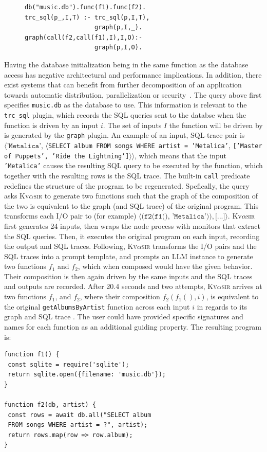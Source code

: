 \documentclass[nonacm,sigplan,review]{acmart}
\newcommand{\sys}{{\scshape Kv{$\alpha$}sir}\xspace}
\newcommand{\ttt}[1]{\texttt{#1}\xspace}
\begin{document}
\begin{figure}
  \begin{verbatim}
db("music.db").func(f1).func(f2).
trc_sql(p_,I,T) :- trc_sql(p,I,T),
                   graph(p,I,_).
graph(call(f2,call(f1),I),I,O):-
                   graph(p,I,O).
\end{verbatim}
\end{figure}
Having the database initialization being in the same function as 
the database access has negative architectural and performance implications.
In addition, there exist systems that can benefit from further decomposition
of an application towards automatic distribution, parallelization or security~\cite{Towards_Modern_Ghemaw_2023, vasilakis2019ignis, vasilakis2018breakapp}.
The query above first specifies \ttt{music.db} as the database to use.
This information is relevant to the \ttt{trc\_sql} plugin, which records the SQL queries 
sent to the databse when the function is driven by an input $i$.
The set of inputs $I$ the function will be driven by is generated by the \ttt{graph} plugin.
An example of an input, SQL-trace pair is
$\langle\ttt{'Metalica'}$, $\langle$\ttt{SELECT album FROM songs WHERE artist = 'Metalica'}, \ttt{['Master of Puppets', 'Ride the Lightning']}$\rangle\rangle$,
which means that the input \ttt{'Metalica'} causes the resulting SQL query to be executed by the function,
which together with the resulting rows is the SQL trace.
The built-in \ttt{call} predicate redefines the structure of the program to be regenerated. 
Spefically, the query asks \sys to generate two functions such 
that the graph of the composition of the two is equivalent to the graph (and SQL trace) of the original program.
This transforms each I/O pair to (for example) $\langle\ttt{(f2(f1(), 'Metalica'))}, \ttt{[...]}\rangle$.
\sys first generates 24 inputs, then wraps the node process with monitors that extract the SQL queries.
Then, it executes the original program on each input, recording the output and SQL traces.
Following, \sys transforms the I/O pairs and the SQL traces into a prompt template,
and prompts an LLM instance to generate two functions $f_1$ and $f_2$, which when composed would have the given behavior.
Their composition is then again driven by the same inputs and the SQL traces and outputs are recorded.
After 20.4 seconds and two attempts, \sys arrives at two functions $f_1$, and 
$f_2$, where their composition $f_2(f_1(), i)$,
is equivalent to the original \ttt{getAlbumsByArtist} function across each input $i$ in regards to its graph and SQL trace .
The user could have provided specific signatures and names for each 
function as an additional guiding property.
The resulting program is:
\begin{verbatim}
function f1() {
 const sqlite = require('sqlite');
 return sqlite.open({filename: 'music.db'});
}

function f2(db, artist) {
 const rows = await db.all("SELECT album
 FROM songs WHERE artist = ?", artist);
 return rows.map(row => row.album); 
}
\end{verbatim}
\end{document}
